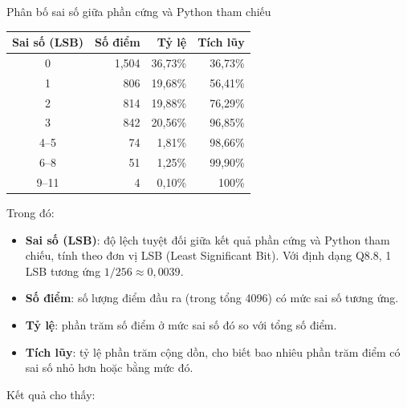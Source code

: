 \documentclass{uetgraduation}
\begin{document}
\begin{table}[h]{Phân bố sai số giữa phần cứng và Python tham chiếu}
    \centering
    \begin{tabular}{|c|r|r|r|}
        \hline
        \textbf{Sai số (LSB)} & \textbf{Số điểm} & \textbf{Tỷ lệ}
            & \textbf{Tích lũy} \\
        \hline
        0           & 1{,}504 & 36{,}73\% & 36{,}73\% \\
        1           & 806     & 19{,}68\% & 56{,}41\% \\
        2           & 814     & 19{,}88\% & 76{,}29\% \\
        3           & 842     & 20{,}56\% & 96{,}85\% \\
        4--5        & 74      & 1{,}81\%  & 98{,}66\% \\
        6--8        & 51      & 1{,}25\%  & 99{,}90\% \\
        9--11       & 4       & 0{,}10\%  & 100\%     \\
        \hline
    \end{tabular}
    \label{tab:error_dist}
\end{table}
Trong đó:
\begin{itemize}
    \item \textbf{Sai số (LSB)}: độ lệch tuyệt đối giữa kết quả phần cứng và Python tham chiếu, tính theo đơn vị LSB (Least Significant Bit). Với định dạng Q8.8, 1 LSB tương ứng $1/256 \approx 0{,}0039$.
    \item \textbf{Số điểm}: số lượng điểm đầu ra (trong tổng 4096) có mức sai số tương ứng.
    \item \textbf{Tỷ lệ}: phần trăm số điểm ở mức sai số đó so với tổng số điểm.
    \item \textbf{Tích lũy}: tỷ lệ phần trăm cộng dồn, cho biết bao nhiêu phần trăm điểm có sai số nhỏ hơn hoặc bằng mức đó.
\end{itemize}
Kết quả cho thấy:
\end{document}
